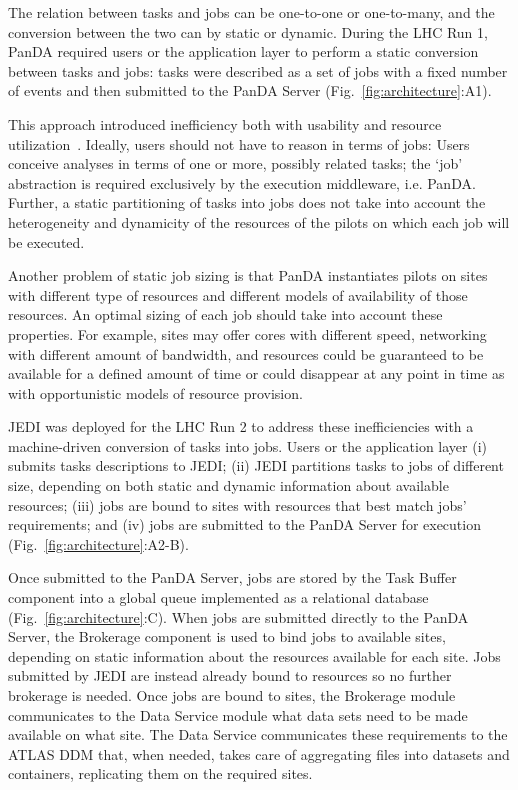 The relation between tasks and jobs can be one-to-one or one-to-many, and the
conversion between the two can by static or dynamic. During the LHC Run 1, PanDA
required users or the application layer to perform a static conversion between
tasks and jobs: tasks were described as a set of jobs with a fixed number of
events and then submitted to the PanDA Server (Fig.~\ref{fig:architecture}:A1).

This approach introduced inefficiency both with usability and resource
utilization~\cite{borodin2015unified}. Ideally, users should not have to reason
in terms of jobs: Users conceive analyses in terms of one or more, possibly
related tasks; the `job' abstraction is required exclusively by the execution
middleware, i.e. PanDA. Further, a static partitioning of tasks into jobs does
not take into account the heterogeneity and dynamicity of the resources of the
pilots on which each job will be executed.

Another problem of static job sizing is that PanDA instantiates pilots on sites
with different type of resources and different models of availability of those
resources. An optimal sizing of each job should take into account these
properties. For example, sites may offer cores with different speed, networking
with different amount of bandwidth, and resources could be guaranteed to be
available for a defined amount of time or could disappear at any point in time
as with opportunistic models of resource provision.

JEDI was deployed for the LHC Run 2 to address these inefficiencies with a
machine-driven conversion of tasks into jobs. Users or the application layer (i)
submits tasks descriptions to JEDI; (ii) JEDI partitions tasks to jobs of
different size, depending on both static and dynamic information about available
resources; (iii) jobs are bound to sites with resources that best match jobs'
requirements; and (iv) jobs are submitted to the PanDA Server for execution
(Fig.~\ref{fig:architecture}:A2-B).

Once submitted to the PanDA Server, jobs are stored by the Task Buffer component
into a global queue implemented as a relational database
(Fig.~\ref{fig:architecture}:C). When jobs are submitted directly to the PanDA
Server, the Brokerage component is used to bind jobs to available sites,
depending on static information about the resources available for each site.
Jobs submitted by JEDI are instead already bound to resources so no further
brokerage is needed. Once jobs are bound to sites, the Brokerage module
communicates to the Data Service module what data sets need to be made available
on what site. The Data Service communicates these requirements to the ATLAS DDM
that, when needed, takes care of aggregating files into datasets and containers,
replicating them on the required sites.

